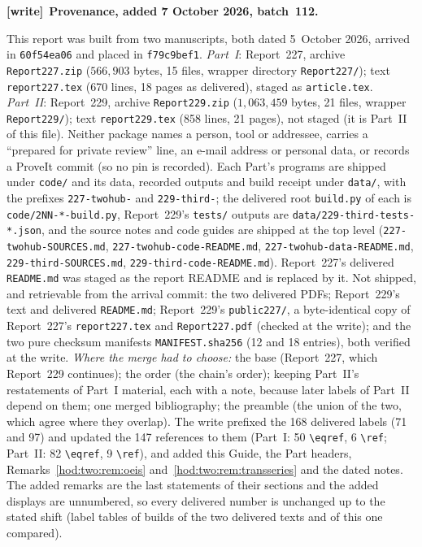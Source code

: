 \documentclass[11pt,letterpaper]{article}
\theoremstyle{definition}\newtheorem{definition}[theorem]{Definition}
\theoremstyle{remark}\newtheorem{remark}[theorem]{Remark}
\newcommand{\file}[1]{\nolinkurl{#1}}
\newenvironment{writenote}[1][]{\par\smallskip\begingroup\small
 \noindent\textbf{[write]}\if\relax\detokenize{#1}\relax\else~\textbf{#1.}\fi\ }%
 {\par\endgroup\smallskip}
\begin{document}
\begin{writenote}[Provenance, added 7 October 2026, batch~112]\raggedright
This report was built from two manuscripts, both dated 5~October 2026,
arrived in \file{60f54ea06} and placed in \file{f79c9bef1}. \emph{Part~I}:
Report~227, archive \file{Report227.zip} ($566{,}903$ bytes, 15 files,
wrapper directory \file{Report227/}); text \file{report227.tex} (670 lines,
18 pages as delivered), staged as \file{article.tex}. \emph{Part~II}:
Report~229, archive \file{Report229.zip} ($1{,}063{,}459$ bytes, 21 files,
wrapper \file{Report229/}); text \file{report229.tex} (858 lines, 21 pages),
not staged (it is Part~II of this file). Neither package names a person,
tool or addressee, carries a ``prepared for private review'' line, an e-mail
address or personal data, or records a ProveIt commit (so no pin is
recorded). Each Part's programs are shipped under \file{code/} and its data,
recorded outputs and build receipt under \file{data/}, with the prefixes
\file{227-twohub-} and \file{229-third-}; the delivered root \file{build.py}
of each is \file{code/2NN-*-build.py}, Report~229's \file{tests/} outputs are
\file{data/229-third-tests-*.json}, and the source notes and code guides are
shipped at the top level (\file{227-twohub-SOURCES.md},
\file{227-twohub-code-README.md}, \file{227-twohub-data-README.md},
\file{229-third-SOURCES.md}, \file{229-third-code-README.md}).
Report~227's delivered \file{README.md} was staged as the report README and is
replaced by it. Not shipped, and retrievable from the arrival commit: the two
delivered PDFs; Report~229's text and delivered \file{README.md}; Report~229's
\file{public227/}, a byte-identical copy of Report~227's \file{report227.tex}
and \file{Report227.pdf} (checked at the write); and the two pure checksum
manifests \file{MANIFEST.sha256} (12 and 18 entries), both verified at the
write. \emph{Where the merge had to choose:} the base (Report~227, which
Report~229 continues); the order (the chain's order); keeping Part~II's
restatements of Part~I material, each with a note, because later labels of
Part~II depend on them; one merged bibliography; the preamble (the union of
the two, which agree where they overlap). The write prefixed the 168 delivered
labels (71 and 97) and updated the 147 references to them (Part~I: 50
\verb|\eqref|, 6 \verb|\ref|; Part~II: 82 \verb|\eqref|, 9 \verb|\ref|), and
added this Guide, the Part headers, Remarks~\ref{hod:two:rem:oeis}
and~\ref{hod:two:rem:transseries} and the dated notes. The added remarks are
the last statements of their sections and the added displays are unnumbered,
so every delivered number is unchanged up to the stated shift (label tables of
builds of the two delivered texts and of this one compared).


\end{writenote}
\end{document}
